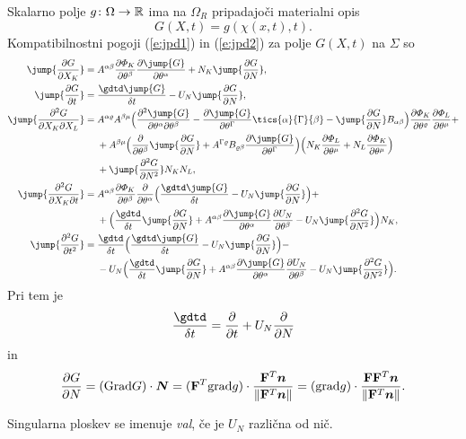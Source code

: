 Skalarno polje $g\colon\Omega\to\mathbb R$ ima na $\Omega_R$ pripadajoči materialni opis
\[ G(X,t)=g(\chi(x,t),t). \]
Kompatibilnostni pogoji (\ref{e:jpd1}) in (\ref{e:jpd2}) za polje $G(X,t)$ na $\Sigma$ so
\begin{align}
	\jump{\frac{\partial G}{\partial X_K}}=\;&
	A^{\alpha\beta}\frac{\partial\varPhi_K}{\partial\theta^{\beta}}
	\frac{\partial \jump{G}}{\partial\theta^{\alpha}}+
	N_K\jump{\frac{\partial G}{\partial N}},\nonumber\\
	\jump{\frac{\partial G}{\partial t}}=\;&
	\frac{\gdtd \jump{G}}{\dtd t}-U_N\jump{\frac{\partial G}{\partial N}},\nonumber\\
	\jump{\frac{\partial^2 G}{\partial X_K\partial X_L}}=\;&
	A^{\alpha\varrho}A^{\beta\mu}\Big( \frac{\partial^2\jump{G}}{\partial\theta^{\alpha}\partial\theta^{\beta}}-
	\frac{\partial\jump{G}}{\partial\theta^{\Gamma}}\tics{\alpha}{\Gamma}{\beta}-
	\jump{\frac{\partial G}{\partial N}}B_{\alpha\beta}\Big)
	\frac{\partial\varPhi_K}{\partial\theta^{\varrho}}\frac{\partial\varPhi_L}{\partial\theta^{\mu}}+ \nonumber \\
	&+A^{\beta\mu}\Big(\frac{\partial}{\partial\theta^{\beta}}\jump{\frac{\partial G}{\partial N}}+
	A^{\Gamma\varrho}B_{\varrho\beta}\frac{\partial\jump{G}}{\partial\theta^{\Gamma}}\Big)
	\Big(N_K\frac{\partial\varPhi_L}{\partial\theta^{\mu}}+N_L\frac{\partial\varPhi_K}{\partial\theta^{\mu}}\Big)
	\nonumber\\&+\jump{\frac{\partial^2 G}{\partial N^2}}N_K N_L,\nonumber\\
	\jump{\frac{\partial^2 G}{\partial X_K\partial t}}=\;&
	A^{\alpha\beta}\frac{\partial\varPhi_K}{\partial\theta^{\beta}}
	\frac{\partial}{\partial\theta^{\alpha}}
	\Big(\frac{\gdtd \jump{G}}{\dtd t}-U_N\jump{\frac{\partial G}{\partial N}}\Big)+ \nonumber \\
	&+\Big(\frac{\gdtd}{\dtd t}\jump{\frac{\partial G}{\partial N}}+
	A^{\alpha\beta}\frac{\partial\jump{G}}{\partial\theta^{\alpha}}
	\frac{\partial U_N}{\partial\theta^{\beta}}-U_N\jump{\frac{\partial^2 G}{\partial N^2}}\Big)N_K,\nonumber\\
	\jump{\frac{\partial^2 G}{\partial t^2}}=\;&
	\frac{\gdtd}{\dtd t}\Big(\frac{\gdtd \jump{G}}{\dtd t}-U_N\jump{\frac{\partial G}{\partial N}}\Big)- \nonumber \\
	&-U_N\Big(\frac{\gdtd}{\dtd t}\jump{\frac{\partial G}{\partial N}}+
	A^{\alpha\beta}\frac{\partial\jump{G}}{\partial\theta^{\alpha}}
	\frac{\partial U_N}{\partial\theta^{\beta}}-U_N\jump{\frac{\partial^2 G}{\partial N^2}}\Big).
\end{align}
Pri tem je
\[
	\frac{\gdtd}{\dtd t}=\frac{\partial}{\partial t}+U_N\frac{\partial}{\partial N}
\]
in
\[
	\frac{\partial G}{\partial N}=(\mathrm{Grad} G)\cdot\boldsymbol N=
	(\mathbf F^{T}\mathrm{grad} g)\cdot\frac{\mathbf F^{T}\boldsymbol n}{\|\mathbf F^{T}\boldsymbol n\|}=
	(\mathrm{grad} g)\cdot\frac{\mathbf F\mathbf F^{T}\boldsymbol n}{\|\mathbf F^{T}\boldsymbol n\|}.
\]

Singularna ploskev se imenuje \emph{val}, če je $U_N$ različna od nič.